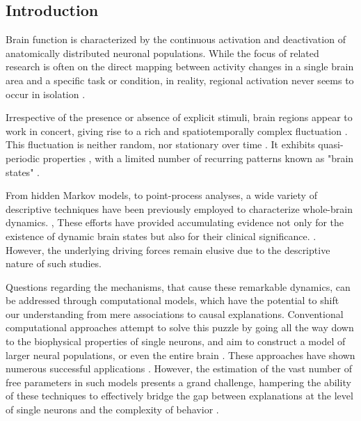 \documentclass{article}
\begin{document}
\subsection{Introduction}\label{Introduction}

Brain function is characterized by the continuous activation and deactivation of anatomically distributed neuronal
populations.
While the focus of related research is often on the direct mapping between activity changes in a single brain
area and a specific task or condition, in reality, regional activation never seems to occur in isolation
\citep{bassett2017network}.

Irrespective of the presence or absence of explicit stimuli, brain regions appear to work in concert, giving rise to a
rich and spatiotemporally complex fluctuation \citep{gutierrez2019infraslow}.
This fluctuation is neither random, nor stationary over time \citep{liu2013time, zalesky2014time}.
It exhibits quasi-periodic properties \citep{thompson2014quasi}, with a limited number of
recurring patterns known as "brain states" \citep{greene2023everyone, vidaurre2017brain, liu2013time, richiardi2011decoding}.

From hidden Markov models, to point-process analyses, a wide variety of descriptive techniques have been previously
employed to characterize whole-brain dynamics. \citep{smith2012temporally, vidaurre2017brain, liu2013time, chen2018human},
These efforts have provided accumulating evidence not only for the existence of dynamic brain states but also for their clinical
significance. \citep{hutchison2013dynamic, barttfeld2015signature, meer2020movie}.
However, the underlying driving forces remain elusive due to the descriptive nature of such studies.

Questions regarding the mechanisms, that cause these remarkable dynamics, can be addressed through computational models, which have the potential to shift our understanding from mere associations to causal
explanations.
Conventional computational approaches attempt to solve this puzzle by going all the way down to the biophysical properties
of single neurons, and aim to construct a model of larger neural populations, or even the entire brain
\citep{breakspear2017dynamic}.
These approaches have shown numerous successful applications \citep{murray2018biophysical, kriegeskorte2018cognitive, heinz2019towards}.
However, the estimation of the vast number of free parameters in such models presents a grand challenge, hampering the ability of these techniques to effectively bridge the gap between explanations at the level of single neurons and the complexity of behavior \citep{breakspear2017dynamic}.
\end{document}
